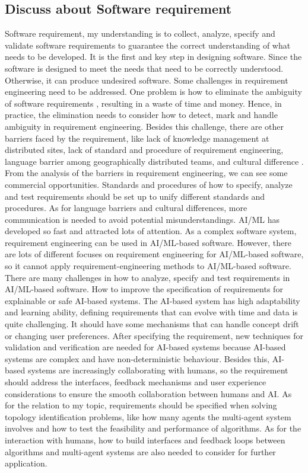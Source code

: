 \documentclass[11pt]{article}
\begin{document}
\subsection*{Discuss about Software requirement}
Software requirement, my understanding is to collect, analyze, specify and validate software requirements to guarantee the correct understanding of what needs to be developed. It is the first and key step in designing software. Since the software is designed to meet the needs that need to be correctly understood. Otherwise, it can produce undesired software. Some challenges in requirement engineering need to be addressed. One problem is how to eliminate the ambiguity of software requirements \cite{gervasi2019ambiguity}, resulting in a waste of time and money. Hence, in practice, the elimination needs to consider how to detect, mark and handle ambiguity in requirement engineering. Besides this challenge, there are other barriers faced by the requirement, like lack of knowledge management at distributed sites, lack of standard and procedure of requirement engineering, language barrier among geographically distributed teams, and cultural difference \cite{akbar2020systematic}. From the analysis of the barriers in requirement engineering, we can see some commercial opportunities. Standards and procedures of how to specify, analyze and test requirements should be set up to unify different standards and procedures. As for language barriers and cultural differences, more communication is needed to avoid potential misunderstandings. AI/ML has developed so fast and attracted lots of attention. As a complex software system, requirement engineering can be used in AI/ML-based software. However, there are lots of different focuses on requirement engineering for AI/ML-based software, so it cannot apply requirement-engineering methods to AI/ML-based software. There are many challenges in how to analyze, specify and test requirements in AI/ML-based software. How to improve the specification of requirements for explainable or safe AI-based systems. The AI-based system has high adaptability and learning ability, defining requirements that can evolve with time and data is quite challenging. It should have some mechanisms that can handle concept drift or changing user preferences.  After specifying the requirement, new techniques for validation and verification are needed for AI-based systems because AI-based systems are complex and have non-deterministic behaviour. Besides this, AI-based systems are increasingly collaborating with humans, so the requirement should address the interfaces, feedback mechanisms and user experience considerations to ensure the smooth collaboration between humans and AI. As for the relation to my topic, requirements should be specified when solving topology identification problems, like how many agents the multi-agent system involves and how to test the feasibility and performance of algorithms. As for the interaction with humans, how to build interfaces and feedback loops between algorithms and multi-agent systems are also needed to consider for further application.
\\
\end{document}
